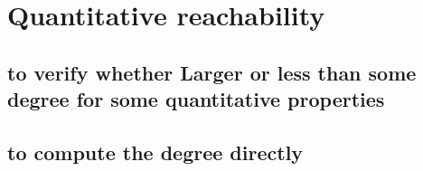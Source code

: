 
\section{Quantitative reachability}

\subsection{to verify whether Larger or less than some degree for some quantitative properties }
\subsection {to compute the degree directly }